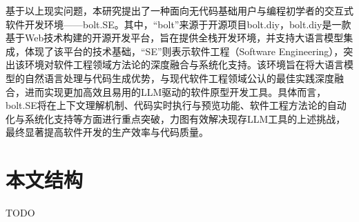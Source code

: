 基于以上现实问题，本研究提出了一种面向无代码基础用户与编程初学者的交互式软件开发环境——bolt.SE。其中，“bolt”来源于开源项目bolt.diy，bolt.diy是一款基于Web技术构建的开源开发平台，旨在提供全栈开发环境，并支持大语言模型集成，体现了该平台的技术基础，“SE”则表示软件工程（Software Engineering），突出该环境对软件工程领域方法论的深度融合与系统化支持。该环境旨在将大语言模型的自然语言处理与代码生成优势，与现代软件工程领域公认的最佳实践深度融合，进而实现更加高效且易用的LLM驱动的软件原型开发工具。具体而言，bolt.SE将在上下文理解机制、代码实时执行与预览功能、软件工程方法论的自动化与系统化支持等方面进行重点突破，力图有效解决现存LLM工具的上述挑战，最终显著提高软件开发的生产效率与代码质量。

\section{本文结构}

TODO